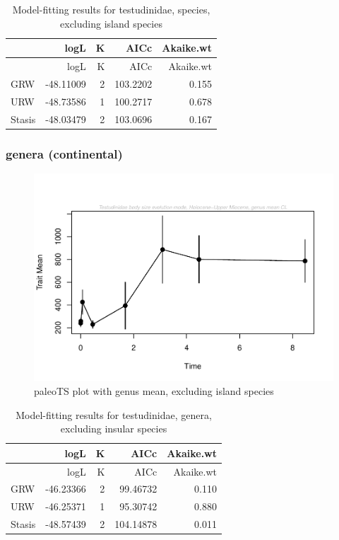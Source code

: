 \documentclass[]{article}
\begin{document}
\begin{longtable}[]{@{}lrrrr@{}}
\caption{Model-fitting results for testudinidae, species, excluding
island species}\tabularnewline
\toprule
& logL & K & AICc & Akaike.wt\tabularnewline
\midrule
\endfirsthead
\toprule
& logL & K & AICc & Akaike.wt\tabularnewline
\midrule
\endhead
GRW & -48.11009 & 2 & 103.2202 & 0.155\tabularnewline
URW & -48.73586 & 1 & 100.2717 & 0.678\tabularnewline
Stasis & -48.03479 & 2 & 103.0696 & 0.167\tabularnewline
\bottomrule
\end{longtable}

\newpage

\subsubsection{genera (continental)}\label{genera-continental}

\begin{figure}[htbp]
\centering
\includegraphics{MA_JJ_files/figure-latex/paleoTS plot with genus mean, excluding island species-1.pdf}
\caption{paleoTS plot with genus mean, excluding island species}
\end{figure}

\begin{longtable}[]{@{}lrrrr@{}}
\caption{Model-fitting results for testudinidae, genera, excluding
insular species}\tabularnewline
\toprule
& logL & K & AICc & Akaike.wt\tabularnewline
\midrule
\endfirsthead
\toprule
& logL & K & AICc & Akaike.wt\tabularnewline
\midrule
\endhead
GRW & -46.23366 & 2 & 99.46732 & 0.110\tabularnewline
URW & -46.25371 & 1 & 95.30742 & 0.880\tabularnewline
Stasis & -48.57439 & 2 & 104.14878 & 0.011\tabularnewline
\bottomrule
\end{longtable}
\end{document}
